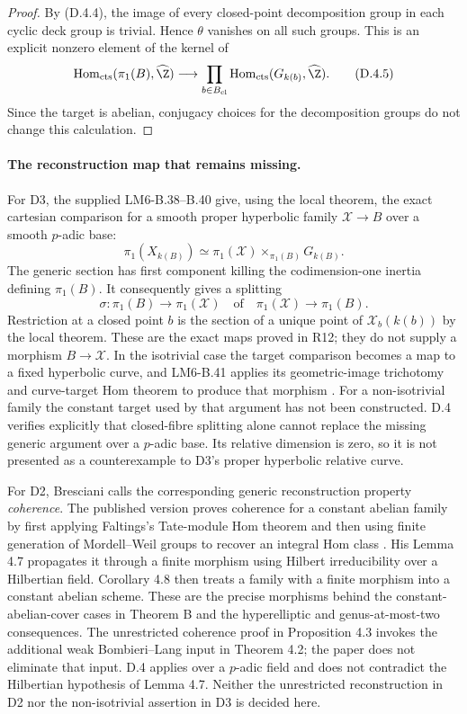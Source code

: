 \begin{proof}
By (D.4.4), the image of every closed-point decomposition
group in each cyclic deck group is trivial. Hence
$\theta$ vanishes on all such groups. This is an explicit
nonzero element of the kernel of
\[
 \operatorname{Hom}_{\mathrm{cts}}(\pi_1(B),\widehat\Z)
 \longrightarrow
 \prod_{b\in B_{\mathrm{cl}}}
 \operatorname{Hom}_{\mathrm{cts}}(G_{k(b)},\widehat\Z).
 \tag{D.4.5}
\]
Since the target is abelian, conjugacy choices for the
decomposition groups do not change this calculation.
\end{proof}

\paragraph{The reconstruction map that remains missing.}
For D3, the supplied LM6-B.38--B.40 give, using the local theorem,
the exact cartesian comparison for a smooth proper hyperbolic
family $\mathcal X\to B$ over a smooth $p$-adic base:
\[
 \pi_1(X_{k(B)})\simeq
 \pi_1(\mathcal X)\times_{\pi_1(B)}G_{k(B)}.
 \tag{D.4.6}
\]
The generic section has first component killing the
codimension-one inertia defining $\pi_1(B)$. It consequently
gives a splitting
\[
 \sigma:\pi_1(B)\longrightarrow\pi_1(\mathcal X)
 \quad\text{of}\quad
 \pi_1(\mathcal X)\longrightarrow\pi_1(B).
 \tag{D.4.7}
\]
Restriction at a closed point $b$ is the section of a unique
point of $\mathcal X_b(k(b))$ by the local theorem. These are
the exact maps proved in R12; they do not supply a morphism
$B\to\mathcal X$. In the isotrivial case the target comparison
becomes a map to a fixed hyperbolic curve, and LM6-B.41 applies
its geometric-image trichotomy and curve-target Hom theorem
to produce that morphism \cite[B.38--B.42]{AgentLM6}.
For a non-isotrivial family the constant target used by that
argument has not been constructed. D.4 verifies explicitly
that closed-fibre splitting alone cannot replace the missing
generic argument over a $p$-adic base. Its relative dimension
is zero, so it is not presented as a counterexample to D3's
proper hyperbolic relative curve.

For D2, Bresciani calls the corresponding generic reconstruction
property \emph{coherence}. The published version proves
coherence for a constant abelian family by first applying
Faltings's Tate-module Hom theorem and then using finite
generation of Mordell--Weil groups to recover an integral
Hom class \cite[Proposition 4.5]{AgentBrescianiFiniteType}.
His Lemma 4.7 propagates it through a finite morphism using
Hilbert irreducibility over a Hilbertian field. Corollary 4.8
then treats a family with a finite morphism into a constant
abelian scheme. These are the precise morphisms behind the
constant-abelian-cover cases in Theorem B and the
hyperelliptic and genus-at-most-two consequences. The
unrestricted coherence proof in Proposition 4.3 invokes the
additional weak Bombieri--Lang input in Theorem 4.2; the paper
does not eliminate that input. D.4 applies over a $p$-adic
field and does not contradict the Hilbertian hypothesis of
Lemma 4.7. Neither the unrestricted reconstruction in D2
nor the non-isotrivial assertion in D3 is decided here.

